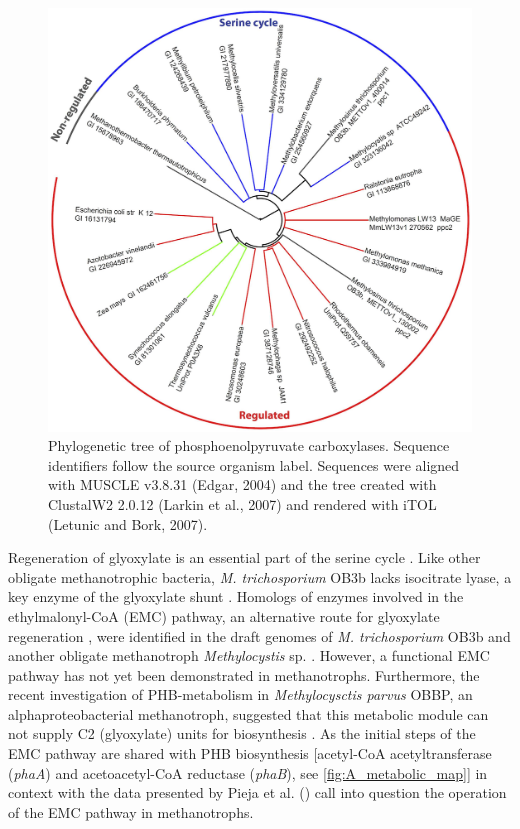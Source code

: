 \begin{figure}[H]
\centering
     \includegraphics[width=1.0\textwidth]{./tex/chapter1/figures/figure3.png}
     \begin{singlespace}
     \caption[Phylogenetic tree of phosphoenolpyruvate carboxylases.]{
        Phylogenetic tree of phosphoenolpyruvate carboxylases.
        Sequence identifiers follow the source organism label. Sequences were aligned with MUSCLE v3.8.31 (Edgar, 2004) and
        the tree created with ClustalW2 2.0.12 (Larkin et al., 2007) and rendered with iTOL (Letunic and Bork, 2007).}
     \end{singlespace}
     \label{fig:B_pep}
\end{figure}

Regeneration of glyoxylate is an essential part of the serine cycle \cite{anthony1982, anthony2011, peyraud2009}.
Like other obligate methanotrophic bacteria, \textit{M. trichosporium} OB3b lacks isocitrate lyase, a key enzyme of the glyoxylate shunt \cite{trotsenko2008}.
Homologs of enzymes involved in the ethylmalonyl-CoA (EMC) pathway, an alternative route for glyoxylate regeneration \cite{peyraud2009}, were identified in the draft genomes of \textit{M. trichosporium} OB3b and another obligate methanotroph \textit{Methylocystis} sp. \cite{stein2010, stein2011}.
However, a functional EMC pathway has not yet been demonstrated in methanotrophs.
Furthermore, the recent investigation of PHB-metabolism in \textit{Methylocysctis parvus} OBBP, an alphaproteobacterial methanotroph, suggested that this metabolic module can not supply C2 (glyoxylate) units for biosynthesis \cite{pieja2011}.
As the initial steps of the EMC pathway are shared with PHB biosynthesis [acetyl-CoA acetyltransferase (\textit{phaA}) and acetoacetyl-CoA reductase (\textit{phaB}), see \ref{fig:A_metabolic_map}] in context with the data presented by Pieja et al. (\cite{pieja2011}) call into question the operation of the EMC pathway in methanotrophs.

